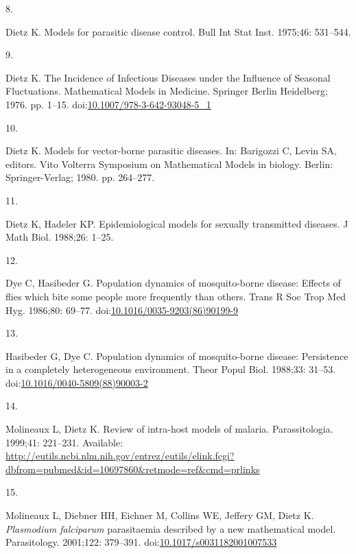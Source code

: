 \documentclass[
]{book}
\newlength{\cslhangindent}
\newlength{\csllabelwidth}
\newlength{\cslentryspacingunit} %
\newenvironment{CSLReferences}[2] %
 {%
  \setlength{\parindent}{0pt}
  \ifodd #1
  \let\oldpar\par
  \def\par{\hangindent=\cslhangindent\oldpar}
  \fi
  \setlength{\parskip}{#2\cslentryspacingunit}
 }%
 {}
\newcommand{\CSLLeftMargin}[1]{\parbox[t]{\csllabelwidth}{#1}}
\newcommand{\CSLRightInline}[1]{\parbox[t]{\linewidth - \csllabelwidth}{#1}\break}
\begin{document}
\begin{CSLReferences}{0}{0}
\leavevmode{}%
\CSLLeftMargin{8. }%
\CSLRightInline{Dietz K. Models for parasitic disease control. Bull Int Stat Inst. 1975;46: 531--544. }

\leavevmode{}%
\CSLLeftMargin{9. }%
\CSLRightInline{Dietz K. The {Incidence} of {Infectious Diseases} under the {Influence} of {Seasonal Fluctuations}. Mathematical {Models} in {Medicine}. {Springer Berlin Heidelberg}; 1976. pp. 1--15. doi:\href{https://doi.org/10.1007/978-3-642-93048-5_1}{10.1007/978-3-642-93048-5\_1}}

\leavevmode{}%
\CSLLeftMargin{10. }%
\CSLRightInline{Dietz K. Models for vector-borne parasitic diseases. In: Barigozzi C, Levin SA, editors. Vito {Volterra Symposium} on {Mathematical Models} in biology. {Berlin}: {Springer-Verlag}; 1980. pp. 264--277. }

\leavevmode{}%
\CSLLeftMargin{11. }%
\CSLRightInline{Dietz K, Hadeler KP. Epidemiological models for sexually transmitted diseases. J Math Biol. 1988;26: 1--25. }

\leavevmode{}%
\CSLLeftMargin{12. }%
\CSLRightInline{Dye C, Hasibeder G. Population dynamics of mosquito-borne disease: Effects of flies which bite some people more frequently than others. Trans R Soc Trop Med Hyg. 1986;80: 69--77. doi:\href{https://doi.org/10.1016/0035-9203(86)90199-9}{10.1016/0035-9203(86)90199-9}}

\leavevmode{}%
\CSLLeftMargin{13. }%
\CSLRightInline{Hasibeder G, Dye C. Population dynamics of mosquito-borne disease: Persistence in a completely heterogeneous environment. Theor Popul Biol. 1988;33: 31--53. doi:\href{https://doi.org/10.1016/0040-5809(88)90003-2}{10.1016/0040-5809(88)90003-2}}

\leavevmode{}%
\CSLLeftMargin{14. }%
\CSLRightInline{Molineaux L, Dietz K. Review of intra-host models of malaria. Parassitologia. 1999;41: 221--231. Available: \url{http://eutils.ncbi.nlm.nih.gov/entrez/eutils/elink.fcgi?dbfrom=pubmed\&id=10697860\&retmode=ref\&cmd=prlinks}}

\leavevmode{}%
\CSLLeftMargin{15. }%
\CSLRightInline{Molineaux L, Diebner HH, Eichner M, Collins WE, Jeffery GM, Dietz K. \emph{Plasmodium falciparum} parasitaemia described by a new mathematical model. Parasitology. 2001;122: 379--391. doi:\href{https://doi.org/10.1017/s0031182001007533}{10.1017/s0031182001007533}}


\end{CSLReferences}
\end{document}
